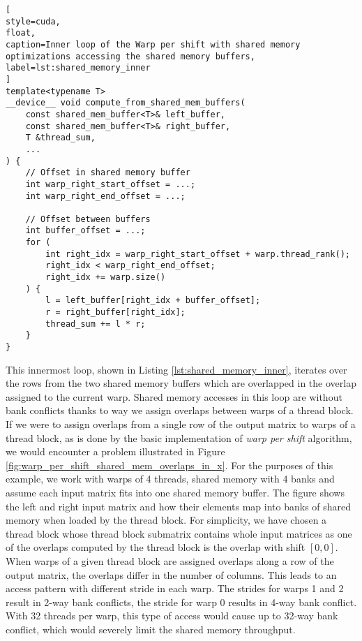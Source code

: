 \begin{lstlisting}[
style=cuda,
float,
caption=Inner loop of the Warp per shift with shared memory optimizations accessing the shared memory buffers,
label=lst:shared_memory_inner
]
template<typename T>
__device__ void compute_from_shared_mem_buffers(
	const shared_mem_buffer<T>& left_buffer,
	const shared_mem_buffer<T>& right_buffer,
	T &thread_sum,
	...
) {
	// Offset in shared memory buffer
	int warp_right_start_offset = ...;
	int warp_right_end_offset = ...;
	
	// Offset between buffers
	int buffer_offset = ...;
	for (
		int right_idx = warp_right_start_offset + warp.thread_rank();
		right_idx < warp_right_end_offset;
		right_idx += warp.size()
	) {
		l = left_buffer[right_idx + buffer_offset];
		r = right_buffer[right_idx];
		thread_sum += l * r; 
	}
}
\end{lstlisting}


This innermost loop, shown in Listing \ref{lst:shared_memory_inner}, iterates over the rows from the two shared memory buffers which are overlapped in the overlap assigned to the current warp. Shared memory accesses in this loop are without bank conflicts thanks to way we assign overlaps between warps of a thread block. If we were to assign overlaps from a single row of the output matrix to warps of a thread block, as is done by the basic implementation of \textit{warp per shift} algorithm, we would encounter a problem illustrated in Figure \ref{fig:warp_per_shift_shared_mem_overlaps_in_x}. For the purposes of this example, we work with warps of 4 threads, shared memory with 4 banks and assume each input matrix fits into one shared memory buffer. The figure shows the left and right input matrix and how their elements map into banks of shared memory when loaded by the thread block. For simplicity, we have chosen a thread block whose thread block submatrix contains whole input matrices as one of the overlaps computed by the thread block is the overlap with shift $[0, 0]$. When warps of a given thread block are assigned overlaps along a row of the output matrix, the overlaps differ in the number of columns. This leads to an access pattern with different stride in each warp. The strides for warps 1 and 2 result in 2-way bank conflicts, the stride for warp 0 results in 4-way bank conflict. With 32 threads per warp, this type of access would cause up to 32-way bank conflict, which would severely limit the shared memory throughput.


